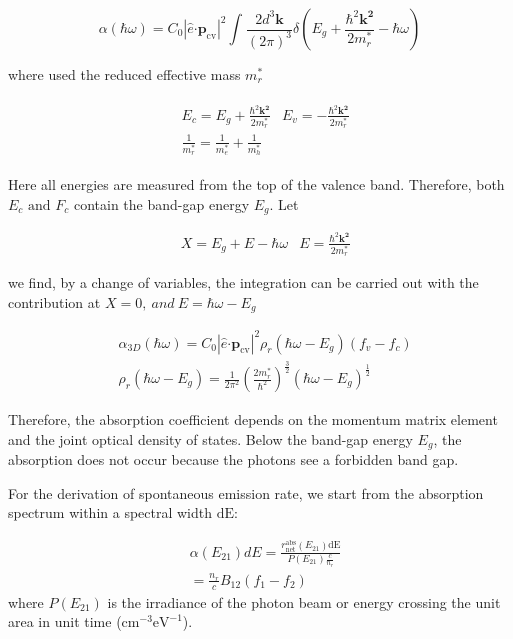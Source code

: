 \begin{equation}
\alpha\left( \hbar\omega \right) = C_{0}\left| \hat{e}\bm{\cdot}\bm{p}_{\text{cv}} \right|^{2}\int_{}^{}\frac{2d^{3}\bm{k}}{\left( 2\pi \right)^{3}}\delta(E_{g} + \frac{\hbar^{2}\bm{k}^{\bm{2}}}{2m_{r}^{*}} - \hbar\omega)
\end{equation}

where used the reduced effective mass \(m_{r}^{*}\)

\begin{eqnarray}
  \begin{aligned}
  & E_{c} = E_{g} + \frac{\hbar^{2}\bm{k}^{\bm{2}}}{2m_{r}^{*}}
  & E_{v} = - \frac{\hbar^{2}\bm{k}^{\bm{2}}}{2m_{r}^{*}} \nonumber \\
  & \frac{1}{m_{r}^{*}} = \frac{1}{m_{e}^{*}} + \frac{1}{m_{h}^{*}}
  \end{aligned}
\end{eqnarray}

Here all energies are measured from the top of the valence band.
Therefore, both \(E_{c}\text{\ and\ }F_{c}\) contain the band-gap energy
\(E_{g}\). Let

\begin{eqnarray}
  & X = E_{g} + E - \hbar\omega
  & E = \frac{\hbar^{2}\bm{k}^{\bm{2}}}{2m_{r}^{\ast}}
\end{eqnarray}

we find, by a change of variables, the integration can be carried out
with the contribution at \(X = 0,\ and\ E = {\hbar\omega - E}_{g}\)

\begin{eqnarray}
  & \alpha_{3D}\left( \hbar\omega \right) = C_{0}\left| \hat{e}\bm{\cdot}\bm{p}_{\text{cv}} \right|^{2}\rho_{r}\left( {\hbar\omega - E}_{g} \right)(f_v-f_c)  \\
  & \rho_{r}\left( {\hbar\omega - E}_{g} \right) = \frac{1}{2\pi^{2}}{(\frac{2m_{r}^{*}}{\hbar^{2}})}^{\frac{3}{2}}\left( {\hbar\omega - E}_{g} \right)^{\frac{1}{2}}
\end{eqnarray}

Therefore, the absorption coefficient depends on the momentum matrix
element and the joint optical density of states. Below the band-gap
energy \(E_{g}\), the absorption does not occur because the photons see
a forbidden band gap.

For the derivation of spontaneous emission rate, we start from the absorption
spectrum within a spectral width \(\text{dE}\):

\begin{eqnarray}
   &  \alpha\left( E_{21} \right)dE = \frac{r_{\text{net}}^{\text{abs}}\left( E_{21} \right)\text{dE}}{P\left( E_{21} \right)\frac{c}{n_{r}}} \nonumber \\
   & = \frac{n_{r}}{c}B_{12}\left( f_{1} - f_{2} \right)
\end{eqnarray}
where \(P\left( E_{21} \right)\) is the irradiance of the photon beam or energy
crossing the unit area in unit time (\(\text{cm}^{- 3}\text{eV}^{- 1}\)).


